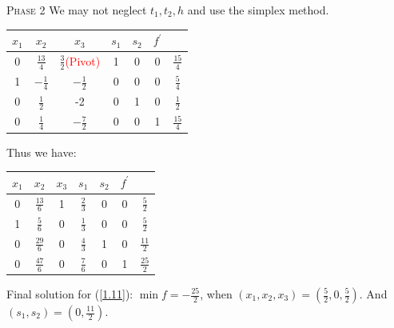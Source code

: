 \noindent\textcolor{MarkerColour}{\textsc{Phase 2}} We may not neglect $t_1, t_2, h$ and use the simplex method.
\begin{table}[H]
        \centering
        \begin{tabular}{|cccccc|c|}
        \hline
        $x_1$ & $x_2$ & $x_3$ & $s_1$ & $s_2$ & $f^{\prime}$ & \\ \hline
        0 & $\frac{13}{4}$ & $\frac{3}{2}$\textcolor{red}{(Pivot)} & 1 & 0 & 0 & $\frac{15}{4}$ \\
        1 & $-\frac{1}{4}$ & $-\frac{1}{2}$ & 0 & 0 & 0 & $\frac{5}{4}$\\ 
        0 & $\frac{1}{2}$ & -2 & 0 & 1 & 0 & $\frac{1}{2}$ \\ \hline
        0 & $\frac{1}{4}$ & $-\frac{7}{2}$ & 0 & 0 & 1 & $\frac{15}{4}$ \\ \hline
        \end{tabular}
        \label{tab-12-5}
\end{table}

Thus we have:
\begin{table}[H]
        \centering
        \begin{tabular}{|cccccc|c|}
        \hline
        $x_1$ & $x_2$ & $x_3$ & $s_1$ & $s_2$ & $f^{\prime}$ & \\ \hline
        0 & $\frac{13}{6}$ & 1 & $\frac{2}{3}$ & 0 & 0 & $\frac{5}{2}$ \\
        1 & $\frac{5}{6}$ & 0 & $\frac{1}{3}$ & 0 & 0 & $\frac{5}{2}$\\ 
        0 & $\frac{29}{6}$ & 0 & $\frac{4}{3}$ & 1 & 0 & $\frac{11}{2}$ \\ \hline
        0 & $\frac{47}{6}$ & 0 & $\frac{7}{6}$ & 0 & 1 & $\frac{25}{2}$ \\ \hline
        \end{tabular}
        \label{tab-12-6}
\end{table}
Final solution for (\ref{1.11}): $\min f=-\frac{25}{2}$, when $(x_1, x_2, x_3) = (\frac{5}{2}, 0, \frac{5}{2})$. And $(s_1, s_2) = (0, \frac{11}{2})$.

